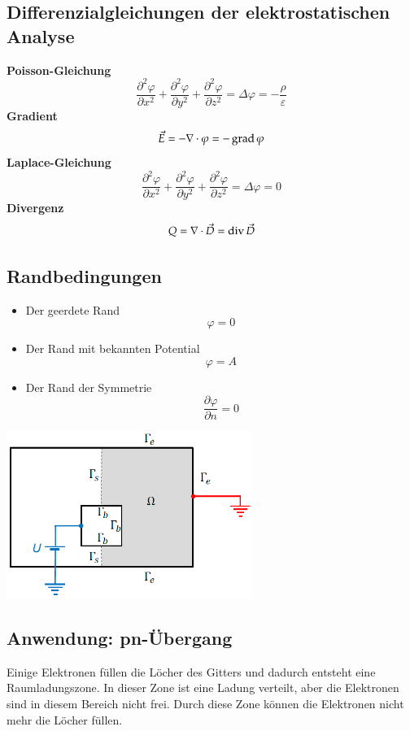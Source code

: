 \subsection{Differenzialgleichungen der elektrostatischen Analyse}
\begin{multicols}{2}
	\textbf{Poisson-Gleichung}  \[ \dfrac{\partial^2\varphi}{\partial x^2} +  \dfrac{\partial^2\varphi}{\partial y^2} + \dfrac{\partial^2\varphi}{\partial z^2} =\Delta \varphi = -\dfrac{\rho}{\varepsilon} \]
	\textbf{Gradient} \[ \vec{E}=- \nabla \cdot \varphi = -\operatorname{grad} \varphi\]
	\textbf{Laplace-Gleichung}  \[ \dfrac{\partial^2\varphi}{\partial x^2} +  \dfrac{\partial^2\varphi}{\partial y^2} + \dfrac{\partial^2\varphi}{\partial z^2} =\Delta \varphi = 0 \]
	\textbf{Divergenz} \[ Q= \nabla \cdot \vec{D}= \operatorname{div} \vec{D} \]
\end{multicols}
\clearpage
\pagebreak
\subsection{Randbedingungen}
\begin{minipage}{8cm}
	\begin{itemize}
		\item Der geerdete Rand \[\varphi = 0\]
		\item Der Rand mit bekannten Potential \[ \varphi = A \]
		\item Der Rand der Symmetrie \[ \dfrac{\partial\varphi}{\partial n} = 0\]
	\end{itemize}
\end{minipage}
\begin{minipage}{8cm}
	\includegraphics[width=8cm]{images/randbedinung_ES.png}
\end{minipage}
\subsection{Anwendung: pn-Übergang}
Einige Elektronen füllen die Löcher des Gitters und dadurch entsteht eine Raumladungszone. In dieser Zone ist eine Ladung verteilt, aber die Elektronen sind in diesem Bereich nicht frei. 
Durch diese Zone können die Elektronen nicht mehr die Löcher füllen.\\

